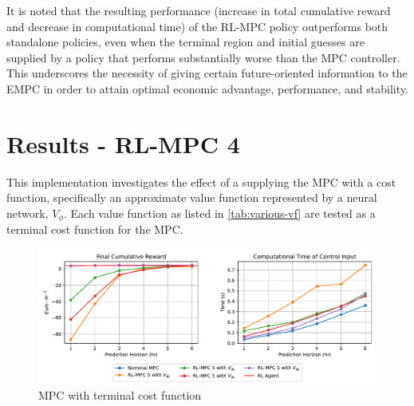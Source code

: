 It is noted that the resulting performance (increase in total cumulative reward and decrease in computational time) of the RL-MPC policy outperforms both standalone policies, even when the terminal region and initial guesses are supplied by a policy that performs substantially worse than the MPC controller. This underscores the necessity of giving certain future-oriented information to the EMPC in order to attain optimal economic advantage, performance, and stability. 

\section{Results - RL-MPC 4}
This implementation investigates the effect of a supplying the MPC with a cost function, specifically an approximate value function represented by a neural network, $V_{\phi}$. Each value function as listed in \autoref{tab:various-vf} are tested as a terminal cost function for the MPC.


\begin{figure}[H]
	\centering
	\includegraphics[width=\textwidth]{figures/rl_mpc_impl_4.pdf}
	\caption{MPC with terminal cost function}
	\label{fig:rlmpc-impl4-all-states}
\end{figure}


